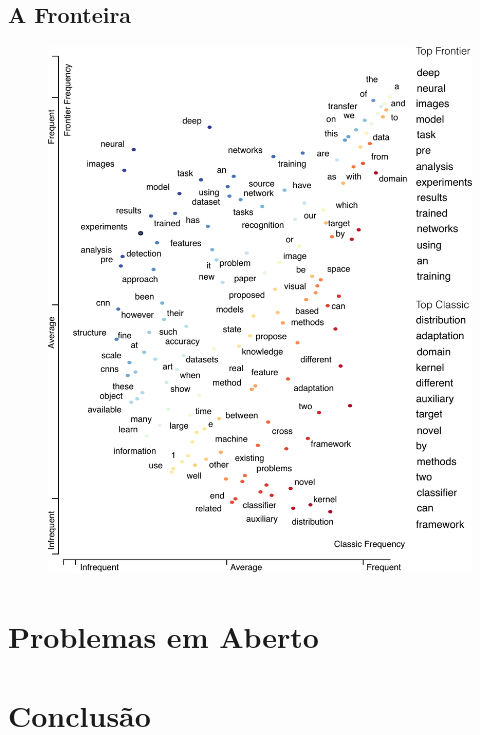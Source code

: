 \documentclass[sigconf]{acmart}
\begin{document}
  \lipsum[3]
  \begin{figure}
    \caption{} \label{fig:studysite}
  \end{figure}
  
  \subsection{A Fronteira}
  \lipsum[2]
  \begin{figure}
    \includegraphics[width=\columnwidth]{frontier3.pdf}
    \caption{} \label{fig:studysite}
  \end{figure}

\section{Problemas em Aberto}
\lipsum[3]
\section{Conclusão}
\lipsum[3]


\end{document}
